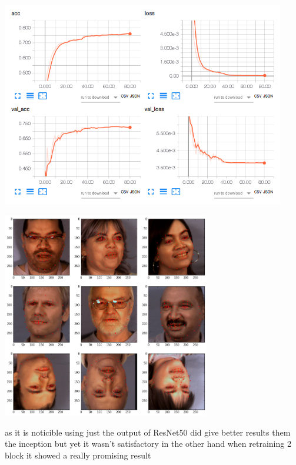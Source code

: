 \documentclass[11pt]{article}
\begin{document}
\begin{enumerate}
\centerline{\includegraphics[height=9cm]{./images/resnet2loss.png}}
\centerline{\includegraphics[height=9cm]{./images/resnet2res.png}}

\pagebreak
as it is noticible using just the output of ResNet50 did give better results
them the inception but yet it wasn't satisfactory in the other hand when
retraining 2 block it showed a really promising result
\end{enumerate}
\end{document}
